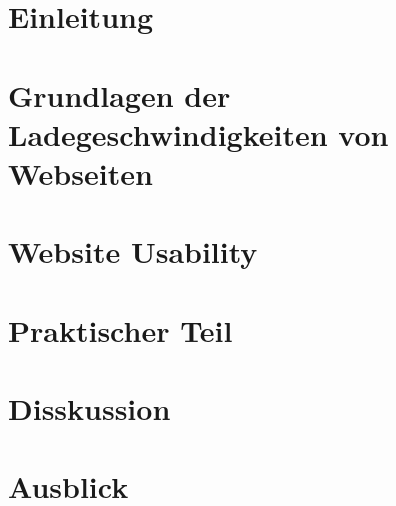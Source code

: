 \documentclass[
  11pt,
  a4paper,
  oneside
]{book}
\begin{document}

\mainmatter

\chapter*{Einleitung}
\label{sec:introduction}



\chapter{Grundlagen der Ladegeschwindigkeiten von Webseiten}
\label{sec:grundlagen_der_ladegeschwindigkeiten_von_websiten}





\chapter{Website Usability}
\label{sec:website_usability}








\chapter{Praktischer Teil}
\label{sec:methods}









\chapter{Disskussion}
\label{sec:results}




\chapter{Ausblick}
\label{sec:discussion}




\end{document}
